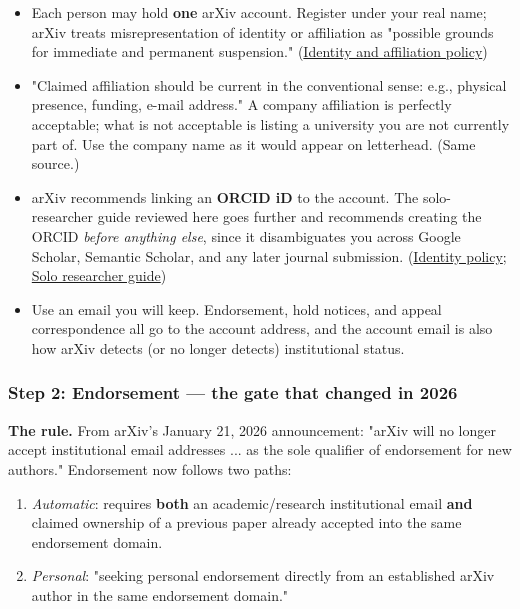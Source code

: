 \documentclass[twocolumn,10pt,letterpaper]{article}
\begin{document}
\begin{itemize}
\setlength{\itemsep}{0pt}
\setlength{\parskip}{0pt}
  \item Each person may hold \textbf{one} arXiv account. Register under your real name; arXiv treats misrepresentation of identity or affiliation as "possible grounds for immediate and permanent suspension." (\href{https://info.arxiv.org/help/policies/identity\_and\_affiliation.html}{Identity and affiliation policy})
  \item "Claimed affiliation should be current in the conventional sense: e.g., physical presence, funding, e-mail address." A company affiliation is perfectly acceptable; what is not acceptable is listing a university you are not currently part of. Use the company name as it would appear on letterhead. (Same source.)
  \item arXiv recommends linking an \textbf{ORCID iD} to the account. The solo-researcher guide reviewed here goes further and recommends creating the ORCID \textit{before anything else}, since it disambiguates you across Google Scholar, Semantic Scholar, and any later journal submission. (\href{https://info.arxiv.org/help/policies/identity\_and\_affiliation.html}{Identity policy}; \href{https://learnedgeek.com/Blog/Post/solo-researcher-guide-arxiv}{Solo researcher guide})
  \item Use an email you will keep. Endorsement, hold notices, and appeal correspondence all go to the account address, and the account email is also how arXiv detects (or no longer detects) institutional status.
\end{itemize}

\subsubsection{Step 2: Endorsement — the gate that changed in 2026}

\textbf{The rule.} From arXiv's January 21, 2026 announcement: "arXiv will no longer accept institutional email addresses ... as the sole qualifier of endorsement for new authors." Endorsement now follows two paths:


\begin{enumerate}
\setlength{\itemsep}{0pt}
\setlength{\parskip}{0pt}
  \item \textit{Automatic}: requires \textbf{both} an academic/research institutional email \textbf{and} claimed ownership of a previous paper already accepted into the same endorsement domain.
  \item \textit{Personal}: "seeking personal endorsement directly from an established arXiv author in the same endorsement domain."
\end{enumerate}
\end{document}
